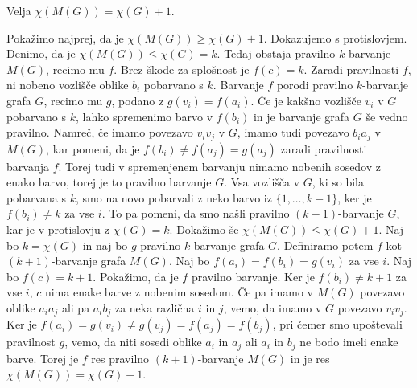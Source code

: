 \documentclass[mat1, tisk]{fmfdelo}
\begin{document}
    \begin{trditev}
        Velja $\chi(M(G)) = \chi(G) + 1$.
    \end{trditev}

    \begin{dokaz}
        Pokažimo najprej, da je $\chi(M(G)) \geq \chi(G) + 1$. Dokazujemo s protislovjem. Denimo, da je $\chi(M(G)) \leq \chi(G) = k$. Tedaj obstaja pravilno $k$-barvanje $M(G)$, recimo mu $f$.
        Brez škode za splošnost je $f(c) = k$. Zaradi pravilnosti $f$, ni nobeno vozlišče oblike $b_i$ pobarvano s $k$. Barvanje $f$ porodi pravilno $k$-barvanje grafa $G$, recimo mu $g$, podano 
        z $g(v_i) = f(a_i)$. Če je kakšno vozlišče $v_i$ v $G$ pobarvano s $k$, lahko spremenimo barvo v $f(b_i)$ in je barvanje grafa $G$ še vedno pravilno. Namreč, če imamo povezavo $v_iv_j$ v $G$, 
        imamo tudi povezavo $b_ia_j$ v $M(G)$, kar pomeni, da je $f(b_i) \neq f(a_j) = g(a_j)$ zaradi pravilnosti barvanja $f$. Torej tudi v spremenjenem barvanju nimamo nobenih sosedov z enako barvo,
        torej je to pravilno barvanje $G$. Vsa vozlišča v $G$, ki so bila pobarvana s $k$, smo na novo pobarvali z neko barvo iz $\{1, \ldots, k-1\}$, ker je $f(b_i) \neq k$ za vse $i$. To pa pomeni,
        da smo našli pravilno $(k-1)$-barvanje $G$, kar je v protislovju z $\chi(G) = k$.
        Dokažimo še $\chi(M(G)) \leq \chi(G) + 1$. Naj bo $k = \chi(G)$ in naj bo $g$ pravilno $k$-barvanje grafa $G$. Definiramo potem $f$ kot $(k+1)$-barvanje grafa $M(G)$. Naj bo $f(a_i) = f(b_i) = g(v_i)$
        za vse $i$. Naj bo $f(c) = k + 1$. Pokažimo, da je $f$ pravilno barvanje. Ker je $f(b_i) \neq k + 1$ za vse $i$, $c$ nima enake barve z nobenim sosedom. Če pa imamo v $M(G)$ povezavo oblike $a_ia_j$ ali 
        pa $a_ib_j$ za neka različna $i$ in $j$, vemo, da imamo v $G$ povezavo $v_iv_j$. Ker je $f(a_i) = g(v_i) \neq g(v_j) = f(a_j) = f(b_j)$, pri čemer smo upoštevali pravilnost $g$, vemo, da niti sosedi oblike
        $a_i$ in $a_j$ ali $a_i$ in $b_j$ ne bodo imeli enake barve. Torej je $f$ res pravilno $(k+1)$-barvanje $M(G)$ in je res $\chi(M(G)) = \chi(G) + 1$.
    \end{dokaz}

\end{document}
